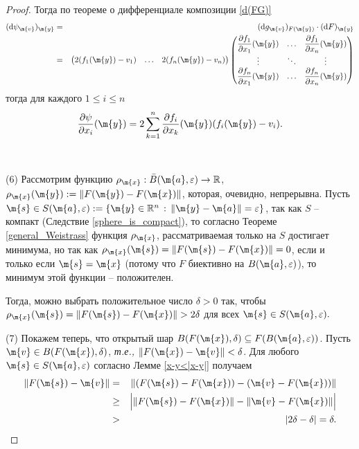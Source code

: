 \begin{proof}
Тогда по теореме о дифференциале композиции \ref{d(FG)}
\begin{eqnarray*}
    (\mathrm{d} \psi_\m{v})_\m{y} &=&(\mathrm{d}g_\m{v})_{F(\m{y})} \cdot (\mathrm{d}F)_\m{y} \\
    &=& \begin{pmatrix}
        2(f_1(\m{y}) - v_1) & \ldots & 2(f_n(\m{y}) - v_n) 
    \end{pmatrix} \begin{pmatrix}
     \dfrac{\partial f_1}{\partial x_1}(\m{y}) & \ldots & \dfrac{\partial f_1}{\partial x_n}(\m{y}) \\
     \vdots & \ddots & \vdots \\
     \dfrac{\partial f_n}{\partial x_1}(\m{y}) & \ldots & \dfrac{\partial f_n}{\partial x_n}(\m{y})
     \end{pmatrix} 
\end{eqnarray*}
тогда для каждого $1 \le i \le n$
\begin{equation}\label{d(psi)}
  \dfrac{\partial \psi}{\partial x_i}(\m{y}) = 2 \sum_{k=1}^n \dfrac{\partial f_i}{\partial x_k}(\m{y}) (f_i(\m{y}) - v_i).    
\end{equation}
~\\

~\\

(6) Рассмотрим функцию $\rho_\m{x}: \bar B(\m{a},\varepsilon) \to \mathbb{R}$, $\rho_\m{x}(\m{y}): = \| F(\m{y}) - F(\m{x})\|$, которая, очевидно, непрерывна. Пусть $\m{s} \in S(\m{a},\varepsilon): = \{\m{y}\in \mathbb{R}^n\, :\, \| \m{y} - \m{a}\| = \varepsilon\}$, так как $S$ -- компакт (Следствие \ref{sphere_is_compact}), то согласно Теореме \ref{general_Weistrass} функция $\rho_\m{x}$, рассматриваемая только на $S$ достигает минимума, но так как $\rho_\m{x}(\m{s}) = \| F(\m{s}) - F(\m{x})\| = 0$, если и только если $\m{s} = \m{x}$ (потому что $F$ биективно на $B(\m{a},\varepsilon)$), то минимум этой функции -- положителен.

Тогда, можно выбрать положительное число $\delta>0$ так, чтобы $\rho_\m{x}(\m{s}) = \| F(\m{s}) - F(\m{x})\| > 2 \delta$ для всех $\m{s} \in S(\m{a}, \varepsilon).$

(7) Покажем теперь, что открытый шар $B(F(\m{x}), \delta) \subseteq F(B(\m{a}, \varepsilon))$. Пусть $\m{v} \in B(F(\m{x}), \delta)$, \textit{т.е.,} $\| F(\m{x}) - \m{v}\| < \delta$. Для любого $\m{s} \in S(\m{a}, \varepsilon)$ согласно Лемме \ref{x-y<|x-y|} получаем
\begin{eqnarray*}
    \| F(\m{s}) - \m{v}\| &=& \| ( F(\m{s}) - F(\m{x} )) - (\m{v} - F(\m{x}))\| \\
    &\ge & \Bigl|  \| F(\m{s}) - F(\m{x})  \| - \| \m{v} - F(\m{x}) \| \Bigr| \\
    &>& |2\delta - \delta| = \delta.
\end{eqnarray*}


\end{proof}
